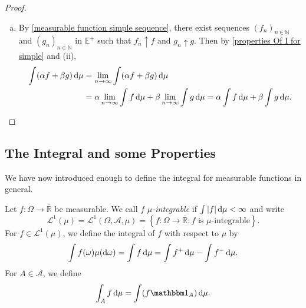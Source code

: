 \begin{proof}
\begin{enumerate}[(a)]
        Now,
        $$\int f_n\d{\mu} \geq \int tg\indic_{A_n}\d{\mu}$$
        Taking the limit as $n\to\infty$ and $t\to 1$, we have
        $$\lim_{n\to\infty}\int f_n\d{\mu}\geq \int g\d{\mu}.$$
        This completes the proof.
        
        \item By \cref{measurable function simple sequence}, there exist sequences $(f_n)_{n\in\mathbb{N}}$ and $(g_n)_{n\in\mathbb{N}}$ in $\mathbb{E}^+$ such that $f_n\uparrow f$ and $g_n\uparrow g$. Then by \cref{properties Of I for simple} and (ii),
        \begin{align*}
            \int (\alpha f+\beta g)\operatorname{d}\!{\mu} &= \lim_{n\to\infty} \int(\alpha f+\beta g)\operatorname{d}\!{\mu} \\
            &= \alpha \lim_{n\to\infty} \int f\operatorname{d}\!{\mu} + \beta \lim_{n\to\infty} \int g\operatorname{d}\!{\mu} = \alpha\int f\operatorname{d}\!{\mu} + \beta\int g\operatorname{d}\!{\mu}.
        \end{align*}
    \end{enumerate}
\end{proof}

    

\subsection{The Integral and some Properties}

We have now introduced enough to define the integral for measurable functions in general.

\begin{definition}
\label{defIntegral}
    Let $f:\Omega\to\overline{\mathbb{R}}$ be measurable. We call $f$ \textit{$\mu$-integrable} if $\int |f|\operatorname{d}\!{\mu}<\infty$ and write
    $$\mathcal{L}^1(\mu)=\mathcal{L}^1(\Omega,\mathcal{A},\mu)=\left\{f:\Omega\to\overline{\mathbb{R}}:f\text{ is }\mu\text{-integrable}\right\}.$$
    For $f\in\mathcal{L}^1(\mu)$, we define the integral of $f$ with respect to $\mu$ by
    $$\int f(\omega)\mu(\operatorname{d}\!{\omega})=\int f\operatorname{d}\!{\mu}=\int f^+\operatorname{d}\!{\mu} - \int f^-\operatorname{d}\!{\mu}.$$
    For $A\in\mathcal{A}$, we define
    $$\int_A f\d{\mu} = \int (f\indic_A)\d{\mu}.$$
\end{definition}

